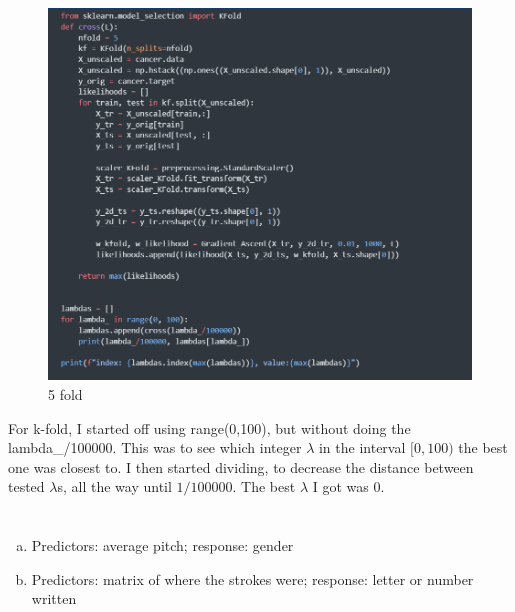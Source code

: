 \documentclass[12pt]{article}
\begin{document}
\begin{itemize}
	\begin{figure}[H]
		\centering
		\includegraphics[width=\textwidth]{images/kfold.png}
		\caption{5 fold}
		\label{fig:4:kfold}
	\end{figure}
	For k-fold, I started off using range(0,100), but without doing the lambda\_/100000. This was to see which integer $ \lambda $ in the interval $ [0,100) $ the best one was closest to. I then started dividing, to decrease the distance between tested $ \lambda $s, all the way until $ 1/100000 $. The best $ \lambda $ I got was 0.
\end{itemize}
\newpage

\section{}
\begin{enumerate}[(a)]
	\item Predictors: average pitch; response: gender
	
	\item Predictors: matrix of where the strokes were; response: letter or number written
\end{enumerate}
\newpage
\end{document}
